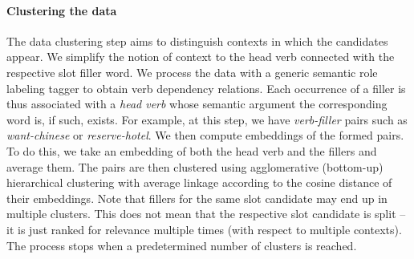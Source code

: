 \paragraph{Clustering the data}
The data clustering step aims to distinguish contexts in which the candidates appear.
We simplify the notion of context to the head verb connected with the respective slot filler word.
We process the data with a generic semantic role labeling tagger to obtain verb dependency relations.
Each occurrence of a filler is thus associated with a \emph{head verb} whose semantic argument the corresponding word is, if such, exists. 
For example, at this step, we have \emph{verb-filler} pairs such as \emph{want-chinese} or \emph{reserve-hotel}.
We then compute embeddings of the formed pairs.
To do this, we take an embedding of both the head verb and the fillers and average them.
The pairs are then clustered using agglomerative (bottom-up) hierarchical clustering with average linkage according to the cosine distance of their embeddings.
Note that fillers for the same slot candidate may end up in multiple clusters.
This does not mean that the respective slot candidate is split -- it is just ranked for relevance multiple times (with respect to multiple contexts).
The process stops when a predetermined number of clusters is reached.

